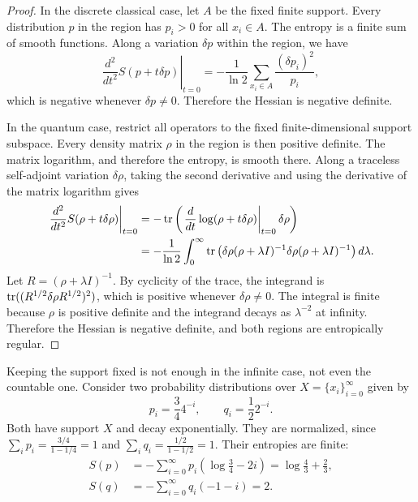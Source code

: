 \begin{mathSection}
\begin{proof}
	In the discrete classical case, let $A$ be the fixed finite support. Every distribution $p$ in the region has $p_i>0$ for all $x_i\in A$. The entropy is a finite sum of smooth functions. Along a variation $\delta p$ within the region, we have
	\begin{equation}
		\left.\frac{d^2}{dt^2}S(p+t\delta p)\right|_{t=0}
		= -\frac{1}{\ln 2}\sum_{x_i\in A}\frac{(\delta p_i)^2}{p_i},
	\end{equation}
	which is negative whenever $\delta p\neq0$. Therefore the Hessian is negative definite.
	
	In the quantum case, restrict all operators to the fixed finite-dimensional support subspace. Every density matrix $\rho$ in the region is then positive definite. The matrix logarithm, and therefore the entropy, is smooth there. Along a traceless self-adjoint variation $\delta\rho$, taking the second derivative and using the derivative of the matrix logarithm gives
	\begin{equation}
		\begin{aligned}
			\left.\frac{d^2}{dt^2}S(\rho+t\delta\rho)\right|_{t=0}
			&= -\operatorname{tr}\left(\left.\frac{d}{dt}\log(\rho+t\delta\rho)\right|_{t=0}\delta\rho\right) \\
			&= -\frac{1}{\ln 2}\int_0^\infty
			\operatorname{tr}\left(\delta\rho(\rho+\lambda I)^{-1}\delta\rho(\rho+\lambda I)^{-1}\right)d\lambda.
		\end{aligned}
	\end{equation}
	Let $R=(\rho+\lambda I)^{-1}$. By cyclicity of the trace, the integrand is $\operatorname{tr}((R^{1/2}\delta\rho R^{1/2})^2)$, which is positive whenever $\delta\rho\neq0$. The integral is finite because $\rho$ is positive definite and the integrand decays as $\lambda^{-2}$ at infinity. Therefore the Hessian is negative definite, and both regions are entropically regular.
\end{proof}

\begin{remark}
	Keeping the support fixed is not enough in the infinite case, not even the countable one. Consider two probability distributions over $X = \{x_i\}_{i=0}^{\infty}$ given by
	$$ p_i = \frac{3}{4}4^{-i}, \qquad q_i = \frac{1}{2}2^{-i}. $$
	Both have support $X$ and decay exponentially. They are normalized, since $\sum_i p_i = \frac{3/4}{1-1/4} = 1$ and $\sum_i q_i = \frac{1/2}{1-1/2} = 1$. Their entropies are finite:
	\begin{equation}
		\begin{aligned}
			S(p) &= -\sum_{i=0}^{\infty} p_i \left(\log\frac{3}{4}-2i\right) = \log\frac{4}{3}+\frac{2}{3}, \\
			S(q) &= - \sum_{i=0}^{\infty} q_i (-1-i) = 2.
		\end{aligned}
	\end{equation}
	

\end{remark}
\end{mathSection}
